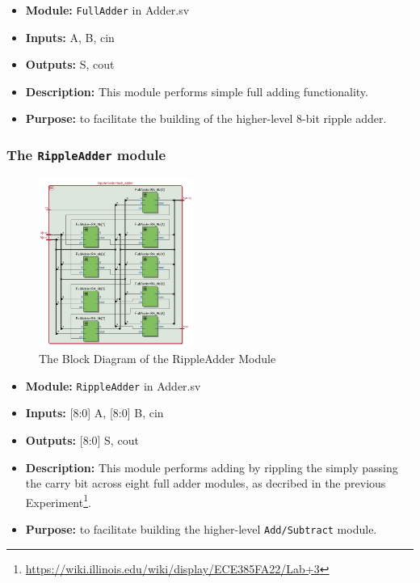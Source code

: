 \documentclass{article}
\begin{document}
\begin{itemize}
    \item \textbf{Module:} \texttt{FullAdder} in Adder.sv
    \item \textbf{Inputs:} A, B, cin
    \item \textbf{Outputs:} S, cout
    \item \textbf{Description:} This module performs simple full adding functionality.
    \item \textbf{Purpose:} to facilitate the building of the higher-level 8-bit ripple adder.
\end{itemize}


\subsubsection{The \texttt{RippleAdder} module}
\begin{figure}[h]
    \centering
    \includegraphics[width=0.45\textwidth]{ripple_adder.png}
    \caption{The Block Diagram of the RippleAdder Module}
    \label{fig:ripple_adder}
\end{figure}

\begin{itemize}
    \item \textbf{Module:} \texttt{RippleAdder} in Adder.sv
    \item \textbf{Inputs:} [8:0] A, [8:0] B, cin
    \item \textbf{Outputs:} [8:0] S, cout
    \item \textbf{Description:} This module performs adding by rippling the simply passing the carry bit across eight full adder modules, as decribed in the previous Experiment\footnote{\url{https://wiki.illinois.edu/wiki/display/ECE385FA22/Lab+3}}.
    \item \textbf{Purpose:} to facilitate building the higher-level \texttt{Add/Subtract} module.
\end{itemize}
\end{document}
